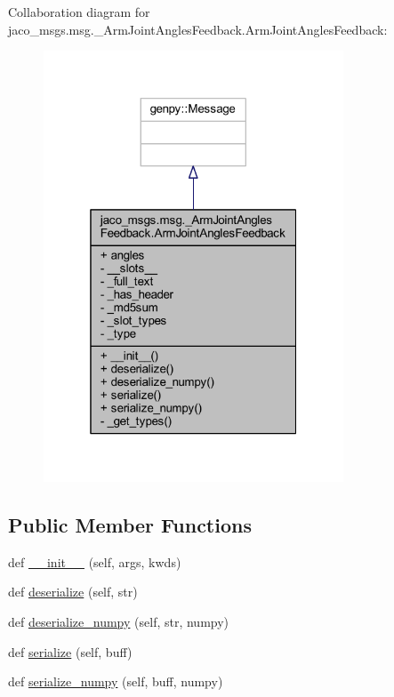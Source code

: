Collaboration diagram for jaco\+\_\+msgs.\+msg.\+\_\+\+Arm\+Joint\+Angles\+Feedback.\+Arm\+Joint\+Angles\+Feedback\+:
\nopagebreak
\begin{figure}[H]
\begin{center}
\leavevmode
\includegraphics[width=253pt]{d2/daf/classjaco__msgs_1_1msg_1_1__ArmJointAnglesFeedback_1_1ArmJointAnglesFeedback__coll__graph}
\end{center}
\end{figure}
\subsection*{Public Member Functions}
\begin{DoxyCompactItemize}
\item 
def \hyperlink{classjaco__msgs_1_1msg_1_1__ArmJointAnglesFeedback_1_1ArmJointAnglesFeedback_a02a9d8b7dda450028c6223b15a5b738d}{\+\_\+\+\_\+init\+\_\+\+\_\+} (self, args, kwds)
\item 
def \hyperlink{classjaco__msgs_1_1msg_1_1__ArmJointAnglesFeedback_1_1ArmJointAnglesFeedback_a541c64ef6b94f203fa50c0e5a7d4877a}{deserialize} (self, str)
\item 
def \hyperlink{classjaco__msgs_1_1msg_1_1__ArmJointAnglesFeedback_1_1ArmJointAnglesFeedback_a914b408f2b1b620dcc157df357beab58}{deserialize\+\_\+numpy} (self, str, numpy)
\item 
def \hyperlink{classjaco__msgs_1_1msg_1_1__ArmJointAnglesFeedback_1_1ArmJointAnglesFeedback_aa7205c0993d8501ebf01cd3060d07e5d}{serialize} (self, buff)
\item 
def \hyperlink{classjaco__msgs_1_1msg_1_1__ArmJointAnglesFeedback_1_1ArmJointAnglesFeedback_ae3f6492d46ff399bcbabcd973cab5f0f}{serialize\+\_\+numpy} (self, buff, numpy)
\end{DoxyCompactItemize}
